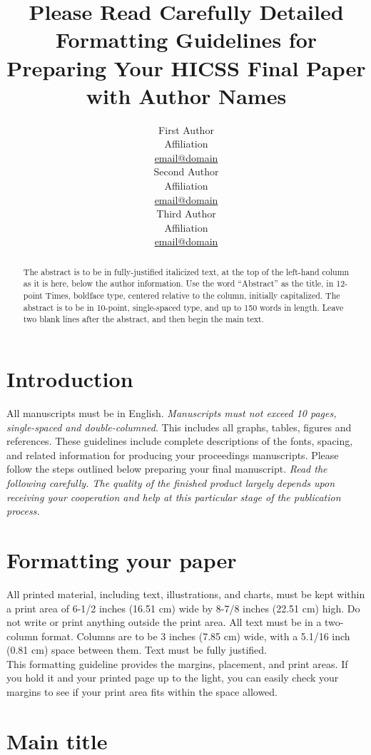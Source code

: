 \documentclass[10pt]{article}
\title{Please Read Carefully Detailed Formatting Guidelines for Preparing Your HICSS Final Paper with Author Names}
\author{First Author \\
  Affiliation \\
  {\underline{ email@domain}} \\\And
  Second Author \\
  Affiliation \\
  {\underline{ email@domain} }\\\And 
  Third Author \\
  Affiliation \\
  {\underline{email@domain}} \\}
\date{}
\begin{document}
\maketitle
\begin{abstract}
    The abstract is to be in fully-justified italicized text, at the top of the left-hand column as it is here, below the author information. Use the word “Abstract” as the title, in 12-point Times, boldface type, centered relative to the column, initially capitalized. The abstract is to be in 10-point, single-spaced type, and up to 150 words in length. Leave two blank lines after the abstract, and then begin the main text.

\end{abstract}

\section{Introduction}

All manuscripts must be in English. {\em Manuscripts must  not exceed 10 pages, single-spaced and double-columned}.  This includes all graphs, tables, figures and references. These guidelines include complete descriptions of the fonts, spacing, and related information for producing your proceedings manuscripts. Please follow the steps outlined below preparing your final manuscript. {\em Read the following carefully. The quality of the finished product largely depends upon receiving your cooperation and help at this particular stage of the publication process.}


\section{Formatting your paper}

All printed material, including text, illustrations, and charts, must be kept within a print area of 6-1/2 inches (16.51 cm) wide by 8-7/8 inches (22.51 cm) high. Do not write or print anything outside the print area. All text must be in a two-column format. Columns are to be 3 inches (7.85 cm) wide, with a 5.1/16 inch (0.81 cm) space between them. Text must be fully justified. \\
This formatting guideline provides the margins, placement, and print areas. If you hold it and your printed page up to the light, you can easily check your margins to see if your print area fits within the space allowed.

\section{Main title}
\end{document}

